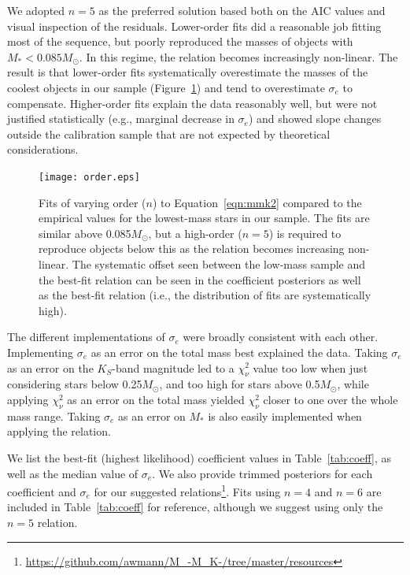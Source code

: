 \documentclass[twocolumn]{aastex62}
\newcommand{\order}{5}
\begin{document}
We adopted $n=\order$ as the preferred solution based both on the AIC values and visual inspection of the residuals. Lower-order fits did a reasonable job fitting most of the sequence, but poorly reproduced the masses of objects with $M_*<0.085M_\odot$. In this regime, the relation becomes increasingly non-linear. The result is that lower-order fits systematically overestimate the masses of the coolest objects in our sample (Figure~\ref{fig:order}) and tend to overestimate $\sigma_e$ to compensate. Higher-order fits explain the data reasonably well, but were not justified statistically (e.g., marginal decrease in $\sigma_e$) and showed slope changes outside the calibration sample that are not expected by theoretical considerations. 

\begin{figure}[h]
\begin{center}
\texttt{[image: order.eps]}
\caption{Fits of varying order ($n$) to Equation~\ref{eqn:mmk2} compared to the empirical values for the lowest-mass stars in our sample. The fits are similar above 0.085$M_\odot$, but a high-order ($n=\order$) is required to reproduce objects below this as the relation becomes increasing non-linear. The systematic offset seen between the low-mass sample and the best-fit relation can be seen in the coefficient posteriors as well as the best-fit relation (i.e., the distribution of fits are systematically high). }
\label{fig:order}
\end{center}
\end{figure}

The different implementations of $\sigma_e$ were broadly consistent with each other. Implementing $\sigma_e$ as an error on the total mass best explained the data. Taking $\sigma_e$ as an error on the $K_S$-band magnitude led to a $\chi^2_\nu$ value too low when just considering stars below 0.25$M_\odot$, and too high for stars above 0.5$M_\odot$, while applying $\chi^2_\nu$ as an error on the total mass yielded $\chi^2_\nu$ closer to one over the whole mass range. Taking $\sigma_e$ as an error on $M_*$ is also easily implemented when applying the relation. 

We list the best-fit (highest likelihood) coefficient values in Table~\ref{tab:coeff}, as well as the median value of $\sigma_e$. We also provide trimmed posteriors for each coefficient and $\sigma_e$ for our suggested relations\footnote{\href{https://github.com/awmann/M_-M_K-/tree/master/resources}{https://github.com/awmann/M\_-M\_K-/tree/master/resources}}. Fits using $n=4$ and $n=6$ are included in Table~\ref{tab:coeff} for reference, although we suggest using only the $n=\order$ relation. 
\end{document}
